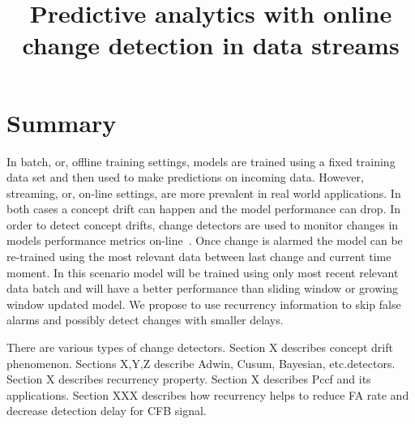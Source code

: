 \documentclass[12 pt]{article}
\title{Predictive analytics with online change detection in data streams}
\date{}
\begin{document}
	\maketitle
  \section{Summary}
  In batch, or, offline training settings, models are trained using a fixed training data set and then used to make predictions on incoming data. 
  However, streaming, or, on-line settings, are more prevalent in real world applications. 
  In both cases a concept drift can happen and the model performance can drop. 
  In order to detect concept drifts, change detectors are used to monitor changes in models performance metrics on-line~\cite{gama2004learning}. 
  Once change is alarmed the model can be re-trained using the most relevant data between last change and current time moment.
  In this scenario model will be trained using only most recent relevant data batch and will have a better performance than sliding window or growing window updated model.
  We propose to use recurrency information to skip false alarms and possibly detect changes with smaller delays.

  There are various types of change detectors. 
  Section X describes concept drift phenomenon.
  Sections X,Y,Z describe Adwin, Cusum, Bayesian, etc.detectors.
  Section X describes recurrency property.
  Section X describes Pccf and its applications.
  Section XXX describes how recurrency helps to reduce FA rate and decrease detection delay for CFB signal.
\end{document}
